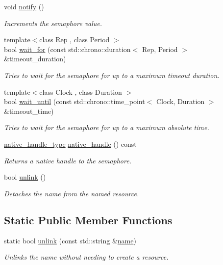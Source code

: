 \begin{DoxyCompactItemize}
void \hyperlink{classcpen333_1_1process_1_1posix_1_1semaphore_a1b9043106c5da18ad152bc83e3de1750}{notify} ()
\begin{DoxyCompactList}\small\item\em Increments the semaphore value. \end{DoxyCompactList}\item 
{\footnotesize template$<$class Rep , class Period $>$ }\\bool \hyperlink{classcpen333_1_1process_1_1posix_1_1semaphore_a8015c878067c3d93748d03c58bb1b233}{wait\+\_\+for} (const std\+::chrono\+::duration$<$ Rep, Period $>$ \&timeout\+\_\+duration)
\begin{DoxyCompactList}\small\item\em Tries to wait for the semaphore for up to a maximum timeout duration. \end{DoxyCompactList}\item 
{\footnotesize template$<$class Clock , class Duration $>$ }\\bool \hyperlink{classcpen333_1_1process_1_1posix_1_1semaphore_a83443f24c1b7b11e5384975e9abc77dc}{wait\+\_\+until} (const std\+::chrono\+::time\+\_\+point$<$ Clock, Duration $>$ \&timeout\+\_\+time)
\begin{DoxyCompactList}\small\item\em Tries to wait for the semaphore for up to a maximum absolute time. \end{DoxyCompactList}\item 
\hyperlink{classcpen333_1_1process_1_1posix_1_1semaphore_ad63150e5c8c196a84a7b214462756f1a}{native\+\_\+handle\+\_\+type} \hyperlink{classcpen333_1_1process_1_1posix_1_1semaphore_a1e4a2d5a032a71fc06a5065f0e83a94c}{native\+\_\+handle} () const
\begin{DoxyCompactList}\small\item\em Returns a native handle to the semaphore. \end{DoxyCompactList}\item 
bool \hyperlink{classcpen333_1_1process_1_1posix_1_1semaphore_aa6064e2c4b4b7282cc5e6eda877ee1bb}{unlink} ()
\begin{DoxyCompactList}\small\item\em Detaches the name from the named resource. \end{DoxyCompactList}\end{DoxyCompactItemize}
\subsection*{Static Public Member Functions}
\begin{DoxyCompactItemize}
\item 
static bool \hyperlink{classcpen333_1_1process_1_1posix_1_1semaphore_ab1399175014f674484217be6d465e878}{unlink} (const std\+::string \&\hyperlink{classcpen333_1_1process_1_1impl_1_1named__resource__base_ae0c5fbb1843afe863cece4b51c38f807}{name})
\begin{DoxyCompactList}\small\item\em Unlinks the name without needing to create a resource. \end{DoxyCompactList}\end{DoxyCompactItemize}

